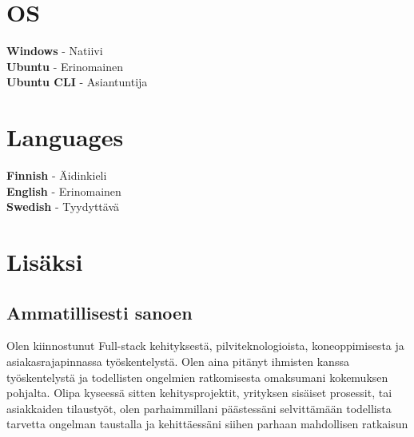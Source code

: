 \documentclass[letterpaper]{twentysecondcv}
\begin{document}



\begin{minipage}[t]{0.5\textwidth}
  \vspace{-\baselineskip} %

  \section{OS}

  \textbf{Windows} - Natiivi \\
  \textbf{Ubuntu} - Erinomainen \\
  \textbf{Ubuntu CLI} - Asiantuntija


\end{minipage}
\hfill
\begin{minipage}[t]{0.5\textwidth}
  \vspace{-\baselineskip} %

  \section{Languages}

  \textbf{Finnish} - Äidinkieli \\
  \textbf{English} - Erinomainen \\
  \textbf{Swedish} - Tyydyttävä \\

\end{minipage}



\section{Lisäksi}


\subsection{Ammatillisesti sanoen}

Olen kiinnostunut Full-stack kehityksestä, pilviteknologioista, koneoppimisesta ja asiakasrajapinnassa työskentelystä.
Olen aina pitänyt ihmisten kanssa työskentelystä ja todellisten ongelmien ratkomisesta omaksumani kokemuksen pohjalta.
Olipa kyseessä sitten kehitysprojektit, yrityksen sisäiset prosessit,
tai asiakkaiden tilaustyöt,
olen parhaimmillani päästessäni selvittämään todellista tarvetta ongelman taustalla ja kehittäessäni siihen parhaan mahdollisen ratkaisun
\end{document}
